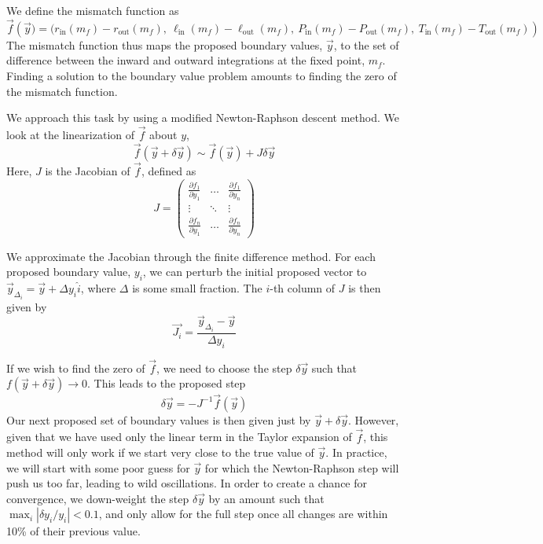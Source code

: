\documentclass[onecolumn]{article}
\newcommand{\D}[2]{\ensuremath{\frac{\partial #1}{\partial #2}}}
\begin{document}
We define the mismatch function as
\begin{equation}
  \vec{f}\left(\vec{y}) = (r_\text{in}(m_f) - r_\text{out}(m_f), \ \ell_\text{in}(m_f) - \ell_\text{out}(m_f), \  P_\text{in}(m_f) - P_\text{out}(m_f), \ T_\text{in}(m_f) - T_\text{out}(m_f)\right)
\end{equation}
The mismatch function thus maps the proposed boundary values, $\vec{y}$, to the set of difference between the inward and outward integrations at the fixed point, $m_f$.  Finding a solution to the boundary value problem amounts to finding the zero of the mismatch function.

We approach this task by using a modified Newton-Raphson descent method.  We look at the linearization of $\vec{f}$ about $y$,
\begin{equation}
  \vec{f}(\vec{y} + \delta\vec{y}) \sim \vec{f}(\vec{y}) + J \delta\vec{y}
\end{equation}
Here, $J$ is the Jacobian of $\vec{f}$, defined as
\begin{equation}
  J = 
  \begin{pmatrix}
    \D{f_1}{y_1} & \ldots & \D{f_1}{y_n} \\
    \vdots & \ddots & \vdots \\
    \D{f_n}{y_1} & \ldots & \D{f_n}{y_n}
  \end{pmatrix}
\end{equation}

We approximate the Jacobian through the finite difference method.  For each proposed boundary value, $y_i$, we can perturb the initial proposed vector to $\vec{y}_{\Delta_i} = \vec{y} + \Delta y_i \hat{i}$, where $\Delta$ is some small fraction.  The $i$-th column of $J$ is then given by
\begin{equation}
  \vec{J_i} =  \frac{\vec{y}_{\Delta_i} - \vec{y}}{\Delta y_i}
\end{equation}

If we wish to find the zero of $\vec{f}$, we need to choose the step $\delta \vec{y}$ such that $f(\vec{y} + \delta\vec{y}) \rightarrow 0$.  This leads to the proposed step
\begin{equation}
  \delta\vec{y} = -J^{-1}\vec{f}(\vec{y})
\end{equation}
Our next proposed set of boundary values is then given just by $\vec{y} + \delta\vec{y}$.  However, given that we have used only the linear term in the Taylor expansion of $\vec{f}$, this method will only work if we start very close to the true value of $\vec{y}$.  In practice, we will start with some poor guess for $\vec{y}$ for which the Newton-Raphson step will push us too far, leading to wild oscillations.  In order to create a chance for convergence, we down-weight the step $\delta\vec{y}$ by an amount such that $\max_i |\delta y_i / y_i| < 0.1$, and only allow for the full step once all changes are within 10\% of their previous value.
\end{document}
